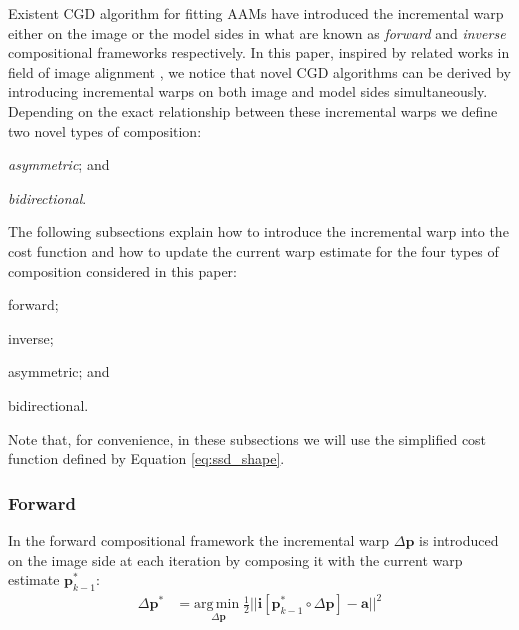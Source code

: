 Existent CGD algorithm for fitting AAMs have introduced the incremental warp either on the image or the model sides in what are known as \emph{forward} and \emph{inverse} compositional frameworks \cite{Matthews2004, Gross2005, Papandreou2008, Amberg2009, Martins2010, Tzimiropoulos2013} respectively. In this paper, inspired by related works in field of image alignment \cite{Malis2004, Megret2008, Autheserre2009, Megret2010}, we notice that novel CGD algorithms can be derived by introducing incremental warps on both image and model sides simultaneously. Depending on the exact relationship between these incremental warps we define two novel types of composition:
\begin{inparaenum}
    \item \emph{asymmetric}; and
    \item \emph{bidirectional}.
\end{inparaenum}

The following subsections explain how to introduce the incremental warp into the cost function and how to update the current warp estimate for the four types of composition considered in this paper: 
\begin{inparaenum}
    \item forward; 
    \item inverse;
    \item asymmetric; and
    \item bidirectional.
\end{inparaenum} Note that, for convenience, in these subsections we will use the simplified cost function defined by Equation \ref{eq:ssd_shape}.

\subsubsection{Forward}
\label{sec:forward}

In the forward compositional framework the incremental warp $\Delta \mathbf{p}$ is introduced on the image side at each iteration by composing it with the current warp estimate $\mathbf{p}_{k-1}^*$:
\begin{equation}
    \begin{aligned}
        \Delta \mathbf{p}^* & = \underset{\Delta \mathbf{p}} {\mathrm{arg\, min\;}} \frac{1}{2}|| \mathbf{i}[\mathbf{p}_{k-1}^* \circ \Delta \mathbf{p}] - \mathbf{a} ||^2
    \label{eq:ssd_fc}
    \end{aligned}
\end{equation}

